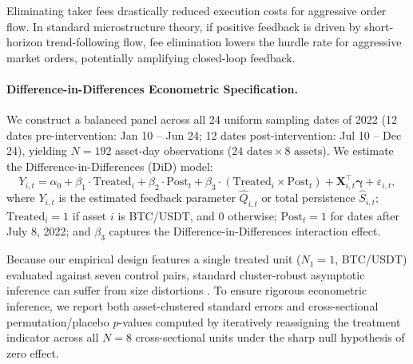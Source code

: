 \documentclass[12pt]{article}
\theoremstyle{definition}
\theoremstyle{remark}
\begin{document}
Eliminating taker fees drastically reduced execution costs for aggressive order flow. In standard microstructure theory, if positive feedback is driven by short-horizon trend-following flow, fee elimination lowers the hurdle rate for aggressive market orders, potentially amplifying closed-loop feedback.

\paragraph{Difference-in-Differences Econometric Specification.}
We construct a balanced panel across all 24 uniform sampling dates of 2022 (12 dates pre-intervention: Jan 10 -- Jun 24; 12 dates post-intervention: Jul 10 -- Dec 24), yielding $N = 192$ asset-day observations ($24 \text{ dates} \times 8 \text{ assets}$).
We estimate the Difference-in-Differences (DiD) model:
\begin{equation}
Y_{i, t} = \alpha_0 + \beta_1 \cdot \text{Treated}_i + \beta_2 \cdot \text{Post}_t + \beta_3 \cdot (\text{Treated}_i \times \text{Post}_t) + \mathbf{X}_{i, t}^\top \boldsymbol{\gamma} + \varepsilon_{i, t},
\label{eq:did_regression}
\end{equation}
where $Y_{i, t}$ is the estimated feedback parameter $\hat{Q}_{i, t}$ or total persistence $\hat{S}_{i, t}$; $\text{Treated}_i = 1$ if asset $i$ is BTC/USDT, and $0$ otherwise; $\text{Post}_t = 1$ for dates after July 8, 2022; and $\beta_3$ captures the Difference-in-Differences interaction effect.

Because our empirical design features a single treated unit ($N_1 = 1$, BTC/USDT) evaluated against seven control pairs, standard cluster-robust asymptotic inference can suffer from size distortions \citep{donald2007inference,mackinnon2018wild}. To ensure rigorous econometric inference, we report both asset-clustered standard errors and cross-sectional permutation/placebo $p$-values computed by iteratively reassigning the treatment indicator across all $N=8$ cross-sectional units under the sharp null hypothesis of zero effect.


\end{document}
